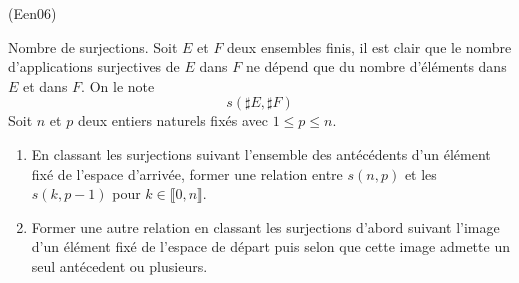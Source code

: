 \begin{tiny}(Een06)\end{tiny} Nombre de surjections.
Soit $E$ et $F$ deux ensembles finis, il est clair que le nombre d'applications surjectives de $E$ dans $F$ ne dépend que du nombre d'éléments dans $E$ et dans $F$. On le note
\begin{displaymath}
 s(\sharp E,\sharp F)
\end{displaymath}
Soit $n$ et $p$ deux entiers naturels fixés avec $1\leq p\leq n$. 
\begin{enumerate}
 \item En classant les surjections suivant l'ensemble des antécédents d'un élément fixé de l'espace d'arrivée, former une relation entre $s(n,p)$ et les $s(k,p-1)$ pour $k\in\llbracket0, n\rrbracket$.
 \item Former une autre relation en classant les surjections d'abord suivant l'image d'un élément fixé de l'espace de départ puis selon que cette image admette un seul antécedent ou plusieurs.
\end{enumerate}
